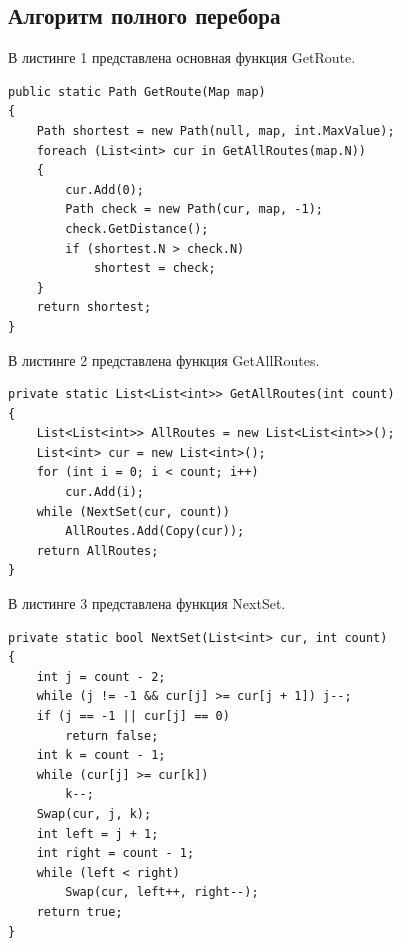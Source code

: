 \documentclass[14pt, a4paper]{extarticle}
\begin{document}
\subsection{Алгоритм полного перебора}
В листинге 1 представлена основная функция GetRoute.
\begin{lstlisting}[caption=GetRoute]
public static Path GetRoute(Map map)
{
	Path shortest = new Path(null, map, int.MaxValue);
	foreach (List<int> cur in GetAllRoutes(map.N))
	{
		cur.Add(0);
		Path check = new Path(cur, map, -1);
		check.GetDistance();
		if (shortest.N > check.N)
			shortest = check;
	}
	return shortest;
}
\end{lstlisting}
В листинге 2 представлена функция GetAllRoutes.
\begin{lstlisting}[caption=GetAllRoutes]
private static List<List<int>> GetAllRoutes(int count)
{
	List<List<int>> AllRoutes = new List<List<int>>();
	List<int> cur = new List<int>();
	for (int i = 0; i < count; i++)
		cur.Add(i);
	while (NextSet(cur, count))
		AllRoutes.Add(Copy(cur));
	return AllRoutes;
}
\end{lstlisting}
В листинге 3 представлена функция NextSet.
\begin{lstlisting}[caption=NextSet]
private static bool NextSet(List<int> cur, int count)
{
	int j = count - 2;
	while (j != -1 && cur[j] >= cur[j + 1]) j--;
	if (j == -1 || cur[j] == 0)
		return false;
	int k = count - 1;
	while (cur[j] >= cur[k]) 
		k--;
	Swap(cur, j, k);
	int left = j + 1; 
	int right = count - 1;
	while (left < right)
		Swap(cur, left++, right--);
	return true;
}
\end{lstlisting}
\end{document}
